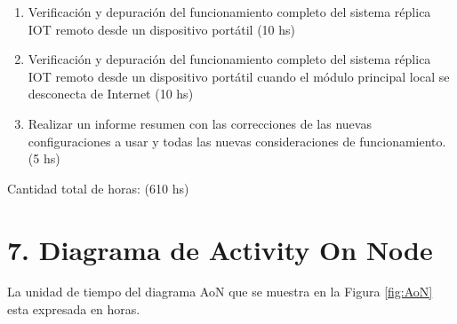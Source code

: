 \documentclass[11pt]{charter}
\begin{document}
\begin{enumerate}
\begin{enumerate}
	\item Verificación y depuración del funcionamiento completo del sistema réplica IOT remoto desde un dispositivo portátil (10 hs)
	\item Verificación y depuración del funcionamiento completo del sistema réplica IOT remoto desde un dispositivo portátil cuando el módulo principal local se desconecta de Internet (10 hs)
	\item Realizar un informe resumen con las correcciones de las nuevas configuraciones a usar y todas las nuevas consideraciones de funcionamiento. (5 hs)
	\end{enumerate}
		
		
\end{enumerate}

Cantidad total de horas: (610 hs)

\section{7. Diagrama de Activity On Node}
\label{sec:AoN}

La unidad de tiempo del diagrama AoN que se muestra en la Figura \ref{fig:AoN}  esta expresada en horas.
\end{document}
